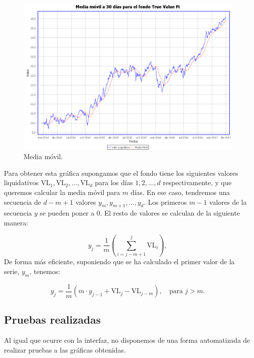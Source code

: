 \documentclass[12pt, a4paper]{book}
\begin{document}
	\begin{figure}[htbp]
	\centering
	\includegraphics[width=\textwidth]{figuras/media.PNG}
	\caption{Media móvil.}
	\label{fig:media}
	\end {figure}
	
	Para obtener esta gráfica supongamos que el fondo tiene los siguientes valores liquidativos $\text{VL}_1,\text{VL}_2,\ldots,\text{VL}_d$ para los días $1,2,\ldots,d$ respectivamente, y que queremos calcular la media móvil para $m$ días. En ese caso, tendremos una secuencia de $d-m+1$ valores $y_m,y_{m+1},\ldots,y_d$. Los primeros $m-1$ valores de la secuencia $y$ se pueden poner a $0$. El resto de valores se calculan de la siguiente manera:
	
	\begin{equation}
	y_j=\frac{1}{m}\left(\sum_{i=j-m+1}^{j}\text{VL}_i\right),
	\end{equation}
	De forma más eficiente, suponiendo que se ha calculado el primer valor de la serie, $y_m$, tenemos:
	
	\begin{equation}
	y_{j}=\frac{1}{m}\left(m\cdot y_{j-1}+\text{VL}_j-\text{VL}_{j-m}\right),\quad\text{para }j>m.
	\end{equation}

\newpage


\subsection{Pruebas realizadas}

Al igual que ocurre con la interfaz, no disponemos de una forma automatizada de realizar pruebas a las gráficas obtenidas.\\
\end{document}
